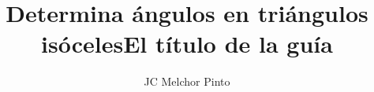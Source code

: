 \documentclass[12pt,addpoints,answers]{guia}
\title{Determina ángulos en triángulos isóceles}
\title{El título de la guía}
\author{JC Melchor Pinto}
\begin{document}
\pagestyle{headandfoot}

\INFO
\printanswers
\vspace{-0.5cm}
\begin{multicols}{2}
    
    
    \columnbreak
    
\end{multicols}

% 
% 
\begin{questions}
    \questionboxed[10]{}
    \questionboxed[10]{}
    \questionboxed[10]{}
    \questionboxed[10]{}
    \questionboxed[10]{}
    \questionboxed[10]{}
    \questionboxed[10]{}
    \questionboxed[10]{}
    \questionboxed[10]{}
    \questionboxed[10]{}
\end{questions}
\end{document}
